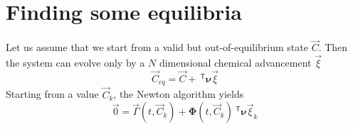 \documentclass[aps]{revtex4}
\newcommand{\mymat}[1]{\bm{#1}}
\newcommand{\mytrn}[1]{~^{\mathsf{T}}{#1}}
\begin{document}
\section{Finding some equilibria}

Let us assume that we start from a valid but out-of-equilibrium state $\vec{C}$.
Then the system can evolve only by a $N$ dimensional chemical advancement $\vec{\xi}$
\begin{equation}
	\vec{C}_{eq} = \vec{C} + \mytrn{\mymat{\nu}}\vec{\xi}
\end{equation}
Starting from a value $\vec{C}_{k}$, the Newton algorithm yields
\begin{equation}
	\vec{0} = \vec{\Gamma}(t,\vec{C}_k) + \mymat{\Phi}(t,\vec{C}_k) \mytrn{\mymat{\nu}}\vec{\xi}_k
\end{equation}
\end{document}
